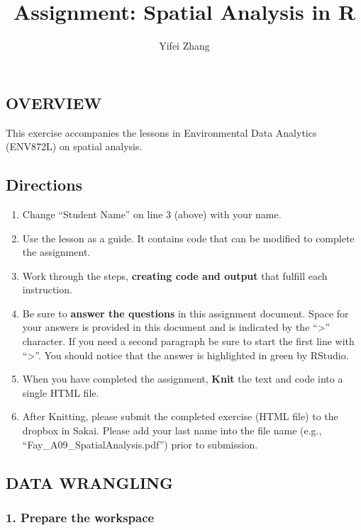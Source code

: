 \documentclass[]{article}
\title{Assignment: Spatial Analysis in R}
\author{Yifei Zhang}
\date{}
\providecommand{\tightlist}{%
  \setlength{\itemsep}{0pt}\setlength{\parskip}{0pt}}
\begin{document}
\maketitle

{
\setcounter{tocdepth}{2}
\tableofcontents
}
\subsection{OVERVIEW}\label{overview}

This exercise accompanies the lessons in Environmental Data Analytics
(ENV872L) on spatial analysis.

\subsection{Directions}\label{directions}

\begin{enumerate}
\def\labelenumi{\arabic{enumi}.}
\tightlist
\item
  Change ``Student Name'' on line 3 (above) with your name.
\item
  Use the lesson as a guide. It contains code that can be modified to
  complete the assignment.
\item
  Work through the steps, \textbf{creating code and output} that fulfill
  each instruction.
\item
  Be sure to \textbf{answer the questions} in this assignment document.
  Space for your answers is provided in this document and is indicated
  by the ``\textgreater{}'' character. If you need a second paragraph be
  sure to start the first line with ``\textgreater{}''. You should
  notice that the answer is highlighted in green by RStudio.
\item
  When you have completed the assignment, \textbf{Knit} the text and
  code into a single HTML file.
\item
  After Knitting, please submit the completed exercise (HTML file) to
  the dropbox in Sakai. Please add your last name into the file name
  (e.g., ``Fay\_A09\_SpatialAnalysis.pdf'') prior to submission.
\end{enumerate}

\subsection{DATA WRANGLING}\label{data-wrangling}

\subsubsection{1. Prepare the workspace}\label{prepare-the-workspace}
\end{document}
